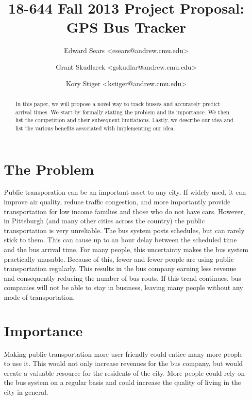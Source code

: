 \documentclass[pageno]{jpaper}
\begin{document}
\title{
18-644 Fall 2013 Project Proposal: GPS Bus Tracker}
\author{Edward Sears <esears@andrew.cmu.edu> \and Grant Skudlarek <gskudlar@andrew.cmu.edu> \and Kory Stiger <kstiger@andrew.cmu.edu>}

\date{}
\maketitle

\thispagestyle{empty}

\begin{abstract}
In this paper, we will propose a novel way to track busses and 
accurately predict arrival times.  We start by formally stating
the problem and its importance.  We then list the competition 
and their subsequent limitations.  Lastly, we describe our 
idea and list the various benefits associated with implementing 
our idea.
\end{abstract}

\section{The Problem}

Public transporation can be an important asset to any city. If widely 
used, it can improve air quality, reduce traffic congestion, and more 
importantly provide transportation for low income families \cite{Criden08} and those who 
do not have cars.  However, in Pittsburgh (and many other cities across the country) 
the public transportation is very unreliable.  The bus system posts 
schedules, but can rarely stick to them.  This can cause up to an 
hour delay between the scheduled time and the bus arrival time.  For 
many people, this uncertainty makes the bus system practically unusable.  
Because of this, fewer and fewer people are using public transportation 
regularly.  This results in the bus company earning less revenue and 
consequently reducing the number of bus routs.  If this trend continues, 
bus companies will not be able to stay in business, leaving many people 
without any mode of transportation.

\section{Importance}

Making public transportation more user friendly could entice many more 
people to use it.  This would not only increase revenues for the bus 
company, but would create a valuable resource for the residents of 
the city.  More people could rely on the bus system on a regular basis 
and could increase the quality of living in the city in general.
\end{document}
